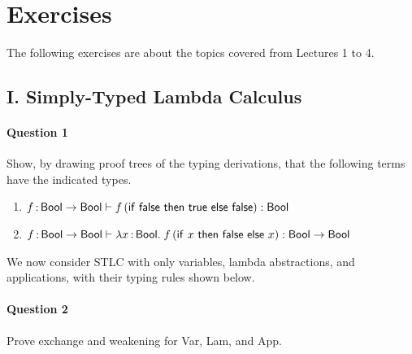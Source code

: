\documentclass[11pt,a4paper,twoside]{article}
\begin{document}
\section*{Exercises}

The following exercises are about the topics covered from Lectures 1 to 4.

\subsection*{I. Simply-Typed Lambda Calculus}

\paragraph{Question 1} Show, by drawing proof trees of the typing
derivations, that the following terms have the indicated types.

\begin{enumerate}[label=(\alph*)]
  \item $f \,{:}\, \mathsf{Bool} \to \mathsf{Bool} \vdash
    f \, (\mathsf{if}\ \mathsf{false} \ \mathsf{then}\ \mathsf{true} \ \mathsf{else}\ \mathsf{false}) : \mathsf{Bool}$
  \item $f \,{:}\, \mathsf{Bool} \to \mathsf{Bool} \vdash
    \lambda x \,{:}\, \mathsf{Bool} .\; f \, (\mathsf{if}\ x \ \mathsf{then}\ \mathsf{false} \ \mathsf{else}\ x) : \mathsf{Bool} \to \mathsf{Bool}$
\end{enumerate}

We now consider STLC with only variables, lambda abstractions, and
applications, with their typing rules shown below.

\begin{center}
  \begin{bprooftree}
  \end{bprooftree}
  \qquad
  \begin{bprooftree}
  \end{bprooftree}
  \qquad
  \begin{bprooftree}
  \end{bprooftree}
\end{center}

\vspace{-1.5em}

\paragraph{Question 2} Prove exchange and weakening for Var, Lam, and App.
\end{document}
